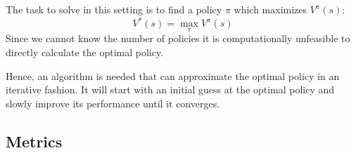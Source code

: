 \documentclass[a4paper,10pt]{article}
\begin{document}
The task to solve in this setting is to find a policy $\pi$ which maximizes $V^\pi(s)$:
\[V^*(s) = \max_\pi V^\pi(s)\]
Since we cannot know the number of policies it is computationally unfeasible to directly calculate the optimal policy.

Hence, an algorithm is needed that can approximate the optimal policy in an iterative fashion.
It will start with an initial guess at the optimal policy and slowly improve its performance until it converges.





\subsection{Metrics}
\end{document}
